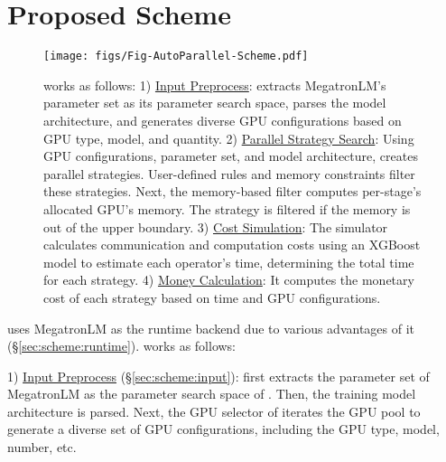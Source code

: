 \section{Proposed Scheme}\label{sec:scheme}


\begin{figure*}[htb!]
\centering
\texttt{[image: figs/Fig-AutoParallel-Scheme.pdf]}
\caption{
\sysname works as follows:
1) \underline{Input Preprocess}: \sysname extracts MegatronLM's parameter set as its parameter search space, parses the model architecture, and generates diverse GPU configurations based on GPU type, model, and quantity.
2) \underline{Parallel Strategy Search}: Using GPU configurations, parameter set, and model architecture, \sysname creates parallel strategies. User-defined rules and memory constraints filter these strategies.
Next, the memory-based filter computes per-stage's allocated GPU's memory. The strategy is filtered if the memory is out of the upper boundary.
3) \underline{Cost Simulation}: The simulator calculates communication and computation costs using an XGBoost model to estimate each operator's time, determining the total time for each strategy.
4) \underline{Money Calculation}: It computes the monetary cost of each strategy based on time and GPU configurations.
}
\label{fig:scheme}
\vspace{-15pt}
\end{figure*}


\sysname uses MegatronLM as the runtime backend due to various advantages of it (\S\ref{sec:scheme:runtime}).
\sysname works as follows:

1) \underline{Input Preprocess} (\S\ref{sec:scheme:input}): \sysname first extracts the parameter set of MegatronLM as the parameter search space of \sysname. Then, the training model architecture is parsed. Next, the GPU selector of \sysname iterates the GPU pool to generate a diverse set of GPU configurations, including the GPU type, model, number, etc.

